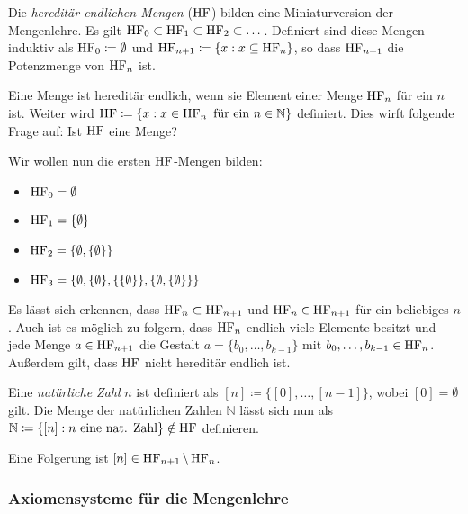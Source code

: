 \begin{definition}
	Die \textit{hereditär endlichen Mengen} ($\operatorname{HF}$) bilden eine Miniaturversion der Mengenlehre. Es gilt $\operatorname{HF}_0\subset \operatorname{HF}_1 \subset \operatorname{HF}_2 \subset \dots$. Definiert sind diese Mengen induktiv als $\operatorname{HF}_0\coloneqq \emptyset$ und $\operatorname{HF}_{n+1}\coloneqq \{x : x\subseteq \operatorname{HF}_n\}$, so dass $\operatorname{HF}_{n+1}$ die Potenzmenge von $\operatorname{HF}_n$ ist.
	
	Eine Menge ist hereditär endlich, wenn sie Element einer Menge $\operatorname{HF}_n$ für ein $n$ ist. Weiter wird $\operatorname{HF}\coloneqq\{x : x \in \operatorname{HF}_n \text{ für ein }n\in \mathbb{N}\}$ definiert.
	Dies wirft folgende Frage auf: Ist $\operatorname{HF}$ eine Menge? 
\end{definition}

\begin{example}
	Wir wollen nun die ersten $\operatorname{HF}$-Mengen bilden:
	\begin{itemize}
		\item $\operatorname{HF}_0=\emptyset$
		\item $\operatorname{HF}_1=\{\emptyset\}$
		\item $\operatorname{HF}_2=\{\emptyset,\{\emptyset\}\}$
		\item $\operatorname{HF}_3=\{\emptyset, \{\emptyset\}, \{\{\emptyset\}\}, \{\emptyset,\{\emptyset\}\}\}$
	\end{itemize}
\end{example}

Es lässt sich erkennen, dass $\operatorname{HF}_n\subset \operatorname{HF}_{n+1}$ und $\operatorname{HF}_n\in \operatorname{HF}_{n+1}$ für ein beliebiges $n$. Auch ist es möglich zu folgern, dass $\operatorname{HF}_n$ endlich viele Elemente besitzt und jede Menge $a\in \operatorname{HF}_{n+1}$ die Gestalt $a=\{b_0,\dots,b_{k-1}\}$ mit $b_0,\dots,b_{k-1}\in \operatorname{HF}_n$. Außerdem gilt, dass $\operatorname{HF}$ nicht hereditär endlich ist.

\begin{definition}
	Eine \textit{natürliche Zahl} $n$ ist definiert als $[n]\coloneqq\{[0],\dots,[n-1]\}$, wobei $[0]=\emptyset$ gilt. Die Menge der natürlichen Zahlen $\mathbb{N}$ lässt sich nun als $\mathbb{N}\coloneqq\{[n] : n \text{ eine nat. Zahl}\} \notin \operatorname{HF}$ definieren.
\end{definition}

Eine Folgerung ist $[n]\in \operatorname{HF}_{n+1}\setminus \operatorname{HF}_n$.

\subsubsection*{Axiomensysteme für die Mengenlehre}

